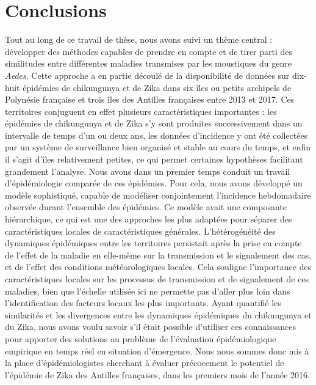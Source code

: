 \chapter*{Conclusions}

Tout au long de ce travail de thèse, nous avons suivi un thème central : développer des méthodes capables de prendre en compte et de tirer parti des similitudes entre différentes maladies transmises par les moustiques du genre {\em Aedes}.
Cette approche a en partie découlé de la disponibilité de données sur dix-huit épidémies de chikungunya et de Zika dans six îles ou petits archipels de Polynésie française et trois îles des Antilles françaises entre 2013 et 2017.
Ces territoires conjuguent en effet plusieurs caractéristiques importantes : les épidémies de chikungunya et de Zika s'y sont produites successivement dans un intervalle de temps d'un ou deux ans, les données d'incidence y ont été collectées par un système de surveillance bien organisé et stable au cours du temps, et enfin il s'agit d'îles relativement petites, ce qui permet certaines hypothèses facilitant grandement l'analyse.
Nous avons dans un premier temps conduit un travail d'épidémiologie comparée de ces épidémies.
Pour cela, nous avons développé un modèle sophistiqué, capable de modéliser conjointement l'incidence hebdomadaire observée durant l'ensemble des épidémies.
Ce modèle avait une composante hiérarchique, ce qui est une des approches les plus adaptées pour séparer des caractéristiques locales de caractéristiques générales. 
L'hétérogénéité des dynamiques épidémiques entre les territoires persistait après la prise en compte de l'effet de la maladie en elle-même sur la transmission et le signalement des cas, et de l'effet des conditions météorologiques locales.
Cela souligne l'importance des caractéristiques locales sur les processus de transmission et de signalement de ces maladies, bien que l'échelle utilisée ici ne permette pas d'aller plus loin dans l'identification des facteurs locaux les plus importants.
Ayant quantifié les similarités et les divergences entre les dynamiques épidémiques du chikungunya et du Zika, nous avons voulu savoir s'il était possible d'utiliser ces connaissances pour apporter des solutions au problème de l'évaluation épidémiologique empirique en temps réel en situation d'émergence.
Nous nous sommes donc mis à la place d'épidémiologistes cherchant à évaluer précocement le potentiel de l'épidémie de Zika des Antilles françaises, dans les premiers mois de l'année 2016.
